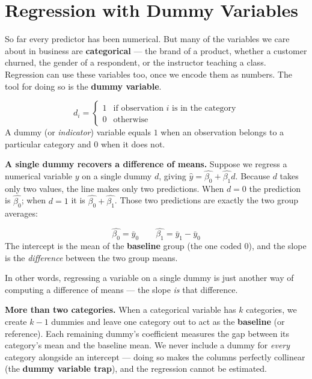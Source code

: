 \documentclass[
  11pt,
  letterpaper,
  DIV=11,
  numbers=noendperiod,
  oneside,
  open=any]{scrreprt}
\begin{document}
\section{Regression with Dummy
Variables}\label{regression-with-dummy-variables}

So far every predictor has been numerical. But many of the variables we
care about in business are \textbf{categorical} --- the brand of a
product, whether a customer churned, the gender of a respondent, or the
instructor teaching a class. Regression can use these variables too,
once we encode them as numbers. The tool for doing so is the
\textbf{dummy variable}.

\begin{bsformula}

\[d_i = \begin{cases} 1 & \text{if observation } i \text{ is in the category} \\ 0 & \text{otherwise} \end{cases}\]
A dummy (or \emph{indicator}) variable equals \(1\) when an observation
belongs to a particular category and \(0\) when it does not.

\end{bsformula}

\textbf{A single dummy recovers a difference of means.} Suppose we
regress a numerical variable \(y\) on a single dummy \(d\), giving
\(\hat{y}=\hat{\beta_0}+\hat{\beta_1}d\). Because \(d\) takes only two
values, the line makes only two predictions. When \(d=0\) the prediction
is \(\hat{\beta_0}\); when \(d=1\) it is
\(\hat{\beta_0}+\hat{\beta_1}\). Those two predictions are exactly the
two group averages:

\begin{bsformula}

\[\hat{\beta_0}=\bar{y}_{0} \qquad \hat{\beta_1}=\bar{y}_{1}-\bar{y}_{0}\]
The intercept is the mean of the \textbf{baseline} group (the one coded
\(0\)), and the slope is the \emph{difference} between the two group
means.

\end{bsformula}

In other words, regressing a variable on a single dummy is just another
way of computing a difference of means --- the slope \emph{is} that
difference.

\textbf{More than two categories.} When a categorical variable has \(k\)
categories, we create \(k-1\) dummies and leave one category out to act
as the \textbf{baseline} (or reference). Each remaining dummy's
coefficient measures the gap between its category's mean and the
baseline mean. We never include a dummy for \emph{every} category
alongside an intercept --- doing so makes the columns perfectly
collinear (the \textbf{dummy variable trap}), and the regression cannot
be estimated.
\end{document}
